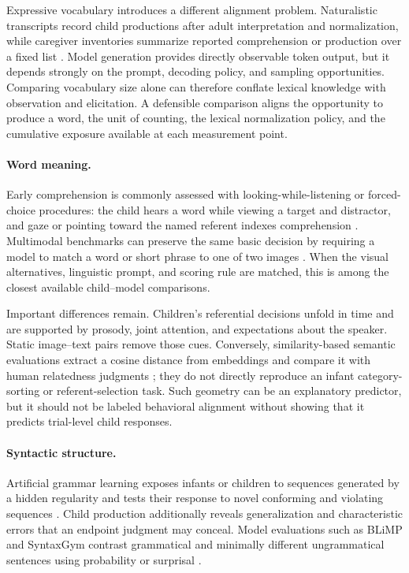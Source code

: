 Expressive vocabulary introduces a different alignment problem. Naturalistic transcripts record child productions after adult interpretation and normalization, while caregiver inventories summarize reported comprehension or production over a fixed list \citep{macwhinney_childes_2000,fenson1994variability}. Model generation provides directly observable token output, but it depends strongly on the prompt, decoding policy, and sampling opportunities. Comparing vocabulary size alone can therefore conflate lexical knowledge with observation and elicitation. A defensible comparison aligns the opportunity to produce a word, the unit of counting, the lexical normalization policy, and the cumulative exposure available at each measurement point.

\paragraph{Word meaning.}
Early comprehension is commonly assessed with looking-while-listening or forced-choice procedures: the child hears a word while viewing a target and distractor, and gaze or pointing toward the named referent indexes comprehension \citep{BergelsonSwingley2012,Lany2011,Bergelson2017,barbir2023rapid}. Multimodal benchmarks can preserve the same basic decision by requiring a model to match a word or short phrase to one of two images \citep{Wang2025}. When the visual alternatives, linguistic prompt, and scoring rule are matched, this is among the closest available child--model comparisons.

Important differences remain. Children's referential decisions unfold in time and are supported by prosody, joint attention, and expectations about the speaker. Static image--text pairs remove those cues. Conversely, similarity-based semantic evaluations extract a cosine distance from embeddings and compare it with human relatedness judgments \citep{Lenci2022}; they do not directly reproduce an infant category-sorting or referent-selection task. Such geometry can be an explanatory predictor, but it should not be labeled behavioral alignment without showing that it predicts trial-level child responses.

\paragraph{Syntactic structure.}
Artificial grammar learning exposes infants or children to sequences generated by a hidden regularity and tests their response to novel conforming and violating sequences \citep{Marcus1999,saffran2002statistical,berent2012binding}. Child production additionally reveals generalization and characteristic errors that an endpoint judgment may conceal. Model evaluations such as BLiMP and SyntaxGym contrast grammatical and minimally different ungrammatical sentences using probability or surprisal \citep{warstadt2020blimp,Hu2020,marvin2018targeted,Salazar2020}.

